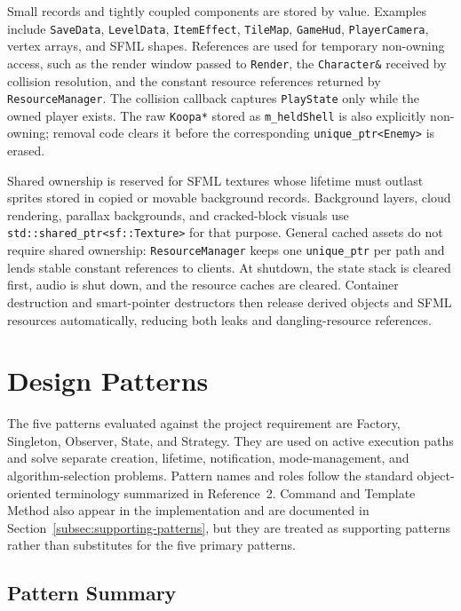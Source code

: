 \documentclass{template}
\begin{document}
Small records and tightly coupled components are stored by value. Examples
include \texttt{SaveData}, \texttt{LevelData}, \texttt{ItemEffect},
\texttt{TileMap}, \texttt{GameHud}, \texttt{PlayerCamera}, vertex arrays, and
SFML shapes. References are used for temporary non-owning access, such as the
render window passed to \texttt{Render}, the \texttt{Character\&} received by
collision resolution, and the constant resource references returned by
\texttt{ResourceManager}. The collision callback captures \texttt{PlayState}
only while the owned player exists. The raw \texttt{Koopa*} stored as
\texttt{m\_heldShell} is also explicitly non-owning; removal code clears it
before the corresponding \texttt{unique\_ptr<Enemy>} is erased.

Shared ownership is reserved for SFML textures whose lifetime must outlast
sprites stored in copied or movable background records. Background layers,
cloud rendering, parallax backgrounds, and cracked-block visuals use
\texttt{std::shared\_ptr<sf::Texture>} for that purpose. General cached assets
do not require shared ownership: \texttt{ResourceManager} keeps one
\texttt{unique\_ptr} per path and lends stable constant references to clients.
At shutdown, the state stack is cleared first, audio is shut down, and the
resource caches are cleared. Container destruction and smart-pointer
destructors then release derived objects and SFML resources automatically,
reducing both leaks and dangling-resource references.

\section{Design Patterns}

The five patterns evaluated against the project requirement are Factory,
Singleton, Observer, State, and Strategy. They are used on active execution
paths and solve separate creation, lifetime, notification, mode-management,
and algorithm-selection problems. Pattern names and roles follow the standard
object-oriented terminology summarized in Reference~2. Command and Template
Method also appear in
the implementation and are documented in
Section~\ref{subsec:supporting-patterns}, but they are treated as supporting
patterns rather than substitutes for the five primary patterns.

\subsection{Pattern Summary}
\end{document}
